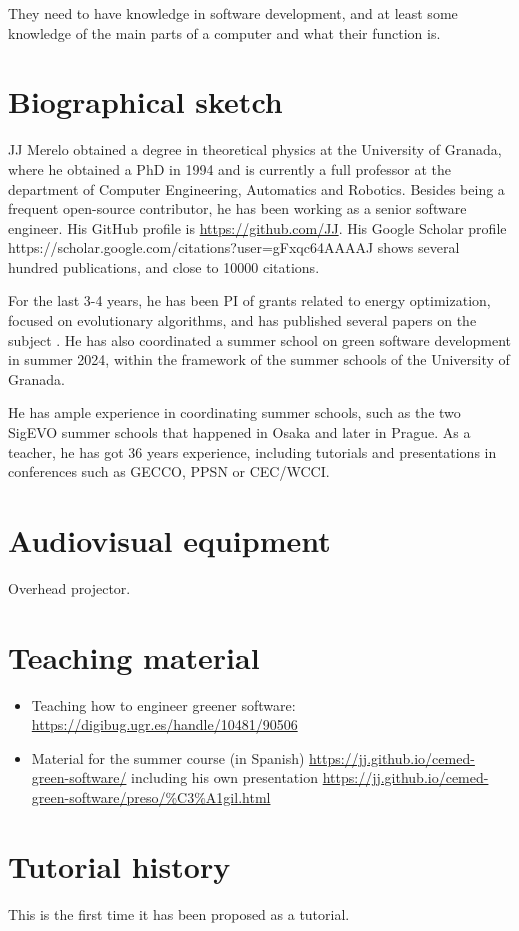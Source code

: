 \documentclass[a4paper]{article}
\begin{document}
They need to have knowledge in software development, and at least some knowledge
of the main parts of a computer and what their function is.

\section{Biographical sketch}

JJ Merelo obtained a degree in theoretical physics at the University of Granada,
where he obtained a PhD in 1994 and is currently a full professor at the
department of Computer Engineering, Automatics and Robotics. Besides being a
frequent open-source contributor, he has been working as a senior software
engineer. His GitHub profile is \url{https://github.com/JJ}. His Google Scholar
profile https://scholar.google.com/citations?user=gFxqc64AAAAJ shows several
hundred publications, and close to 10000 citations.

For the last 3-4 years, he has been PI of grants related to energy optimization,
focused on evolutionary algorithms, and has published several papers on the
subject \cite{DBLP:conf/icsoft/GuervosGC23}. He has also coordinated a summer
school on green software development in summer 2024, within the framework of the
summer schools of the University of Granada.

He has ample experience in coordinating summer schools, such as the two
SigEVO summer schools that happened in Osaka and later in Prague. As a teacher,
he has got 36 years experience, including tutorials and presentations in
conferences such as GECCO, PPSN or CEC/WCCI.

\section{Audiovisual equipment}

Overhead projector.

\section{Teaching material}

\begin{itemize}
  \item Teaching how to engineer greener software:
    \url{https://digibug.ugr.es/handle/10481/90506}
  \item Material for the summer course (in Spanish)
    \url{https://jj.github.io/cemed-green-software/} including his own
    presentation
    \url{https://jj.github.io/cemed-green-software/preso/\%C3\%A1gil.html}
\end{itemize}

\section{Tutorial history}

    This is the first time it has been proposed as a tutorial.



\end{document}
